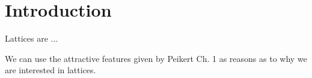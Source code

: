 \section{Introduction}
Lattices are ... %

We can use the attractive features given by Peikert Ch. 1 as reasons as to why we are interested in lattices.